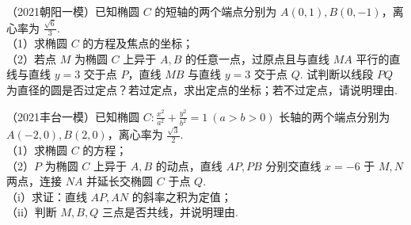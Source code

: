 \begin{example} %
（2021朝阳一模）已知椭圆 $C$ 的短轴的两个端点分别为 $A(0,1),B(0,-1)$，离心率为 $\frac{\sqrt{6}}{3}$.\\
（1）求椭圆 $C$ 的方程及焦点的坐标；\\
（2）若点 $M$ 为椭圆 $C$ 上异于 $A,B$ 的任意一点，过原点且与直线 $MA$ 平行的直线与直线 $y=3$ 交于点 $P$，直线 $MB$ 与直线 $y=3$ 交于点 $Q$. 试判断以线段 $PQ$ 为直径的圆是否过定点？若过定点，求出定点的坐标；若不过定点，请说明理由.
\end{example}

\begin{example} %
（2021丰台一模）已知椭圆 $C:\frac{x^2}{a^2}+\frac{y^2}{b^2}=1\ (a>b>0)$ 长轴的两个端点分别为 $A(-2,0),B(2,0)$，离心率为 $\frac{\sqrt{3}}{2}$.\\
（1）求椭圆 $C$ 的方程；\\
（2）$P$ 为椭圆 $C$ 上异于 $A,B$ 的动点，直线 $AP,PB$ 分别交直线 $x=-6$ 于 $M,N$ 两点，连接 $NA$ 并延长交椭圆 $C$ 于点 $Q$.\\
（i）求证：直线 $AP,AN$ 的斜率之积为定值；\\
（ii）判断 $M,B,Q$ 三点是否共线，并说明理由.
\end{example}



